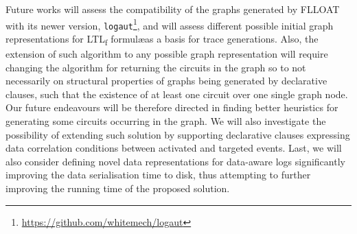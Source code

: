\documentclass[sigconf]{acmart}
\newcommand{\LTLf}{\textup{LTL}\textsubscript{f}\xspace}
\begin{document}
Future works will assess the compatibility of the graphs generated by FLLOAT with its newer version, \texttt{logaut}\footnote{\url{https://github.com/whitemech/logaut}}, and will assess different possible initial graph representations for \LTLf formul\ae as a basis for trace generations. Also, the extension of such algorithm to any possible graph representation will require changing the algorithm for returning the circuits in the graph so to not necessarily on structural properties of graphs being generated by declarative clauses, such that the existence of at least one circuit over one single graph node. Our future endeavours will be therefore directed in finding better heuristics for generating some circuits occurring in the graph. We will also investigate the possibility of extending such solution by supporting declarative clauses expressing data correlation conditions between activated and targeted events. Last, we will also consider defining novel data representations for data-aware logs significantly improving the data serialisation time to disk, thus attempting to further improving the running time of the proposed solution.




\end{document}

